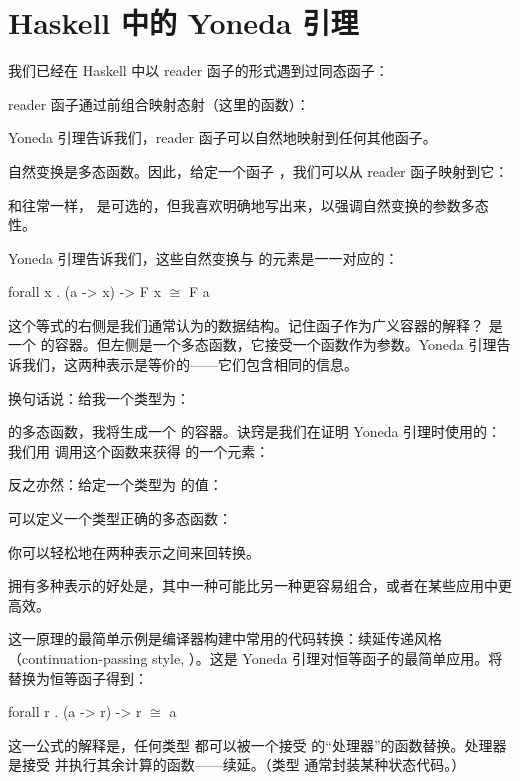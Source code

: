 \section{Haskell 中的 Yoneda 引理}

我们已经在 Haskell 中以 reader 函子的形式遇到过同态函子：

reader 函子通过前组合映射态射（这里的函数）：

Yoneda 引理告诉我们，reader 函子可以自然地映射到任何其他函子。

自然变换是多态函数。因此，给定一个函子 ，我们可以从 reader 函子映射到它：

和往常一样， 是可选的，但我喜欢明确地写出来，以强调自然变换的参数多态性。

Yoneda 引理告诉我们，这些自然变换与  的元素是一一对应的：

\begin{snipv}
  forall x . (a -> x) -> F x \ensuremath{\cong} F a
\end{snipv}
这个等式的右侧是我们通常认为的数据结构。记住函子作为广义容器的解释？ 是一个  的容器。但左侧是一个多态函数，它接受一个函数作为参数。Yoneda 引理告诉我们，这两种表示是等价的——它们包含相同的信息。

换句话说：给我一个类型为：

的多态函数，我将生成一个  的容器。诀窍是我们在证明 Yoneda 引理时使用的：我们用  调用这个函数来获得  的一个元素：

反之亦然：给定一个类型为  的值：

可以定义一个类型正确的多态函数：

你可以轻松地在两种表示之间来回转换。

拥有多种表示的好处是，其中一种可能比另一种更容易组合，或者在某些应用中更高效。

这一原理的最简单示例是编译器构建中常用的代码转换：续延传递风格（continuation-passing style, ）。这是 Yoneda 引理对恒等函子的最简单应用。将  替换为恒等函子得到：

\begin{snipv}
  forall r . (a -> r) -> r \ensuremath{\cong} a
\end{snipv}
这一公式的解释是，任何类型  都可以被一个接受  的“处理器”的函数替换。处理器是接受  并执行其余计算的函数——续延。（类型  通常封装某种状态代码。）


